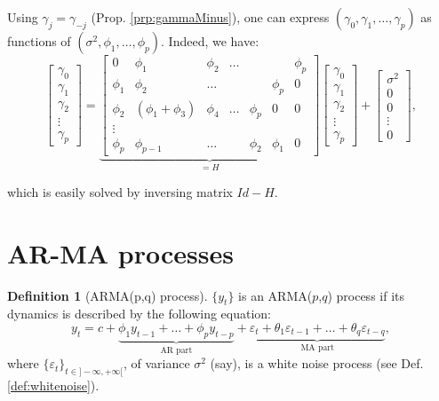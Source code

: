 \documentclass[
  12pt,
]{book}
\theoremstyle{definition}
\newtheorem{definition}{Definition}[chapter]
\theoremstyle{definition}
\theoremstyle{definition}
\theoremstyle{definition}
\theoremstyle{remark}
\begin{document}
Using \(\gamma_j = \gamma_{-j}\) (Prop. \ref{prp:gammaMinus}), one can express \((\gamma_0,\gamma_1,\dots,\gamma_{p})\) as functions of \((\sigma^2,\phi_1,\dots,\phi_p)\). Indeed, we have:
\[
\left[\begin{array}{c}
\gamma_0 \\
\gamma_1 \\
\gamma_2 \\
\vdots\\
\gamma_p
\end{array}\right] =
\underbrace{\left[\begin{array}{cccccccc}
0 & \phi_1 & \phi_2 & \dots &&& \phi_p \\
\phi_1 & \phi_2 & \dots &&& \phi_p & 0 \\
\phi_2 & (\phi_1 + \phi_3) & \phi_4 & \dots & \phi_p& 0& 0 \\
\vdots\\
\phi_p & \phi_{p-1} & \dots &&\phi_2& \phi_1 & 0
\end{array}\right]}_{=H}\left[\begin{array}{c}
\gamma_0 \\
\gamma_1 \\
\gamma_2 \\
\vdots\\
\gamma_p
\end{array}\right] +
\left[\begin{array}{c}
\sigma^2 \\
0 \\
0 \\
\vdots\\
0
\end{array}\right],
\]

which is easily solved by inversing matrix \(Id - H\).

\hypertarget{ar-ma-processes}{%
\section{AR-MA processes}\label{ar-ma-processes}}

\begin{definition}[ARMA(p,q) process]
\protect\hypertarget{def:ARMApq}{}\label{def:ARMApq}\(\{y_t\}\) is an ARMA(\(p\),\(q\)) process if its dynamics is described by the following equation:
\begin{equation}
y_t = c + \underbrace{\phi_1 y_{t-1} + \dots + \phi_p y_{t-p}}_{\mbox{AR part}} + \underbrace{\varepsilon_t + \theta_1 \varepsilon_{t-1} + \dots + \theta_q \varepsilon_{t-q}}_{\mbox{MA part}},\label{eq:ARMApq}
\end{equation}
where \(\{\varepsilon_t\}_{t \in ] -\infty,+\infty[}\), of variance \(\sigma^2\) (say), is a white noise process (see Def. \ref{def:whitenoise}).
\end{definition}
\end{document}
